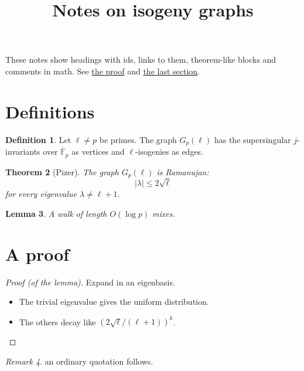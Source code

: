 \documentclass{amsart}
\newtheorem{theorem}{Theorem}
\newtheorem{lemma}[theorem]{Lemma}
\theoremstyle{definition}
\newtheorem{definition}[theorem]{Definition}
\theoremstyle{remark}
\newtheorem{remark}[theorem]{Remark}
\begin{document}
\title{Notes on isogeny graphs}
\maketitle

These notes show headings with ids, links to them, theorem-like blocks and comments in
math. See \hyperref[tn-h-a-proof]{the proof} and \hyperref[tn-h-remarks-questions]{the last section}.

\section{Definitions}\label{tn-h-definitions}

\begin{definition}
Let \(\ell \ne p\) be primes. The graph \(G_p(\ell)\) has the supersingular
\(j\)-invariants over \(\overline{\mathbb{F}}_p\) as vertices and \(\ell\)-isogenies as edges.

\end{definition}

\begin{theorem}[{Pizer}]
The graph \(G_p(\ell)\) is Ramanujan:
\[
|\lambda| \le 2\sqrt{\ell}
\]
for every eigenvalue \(\lambda \ne \ell + 1\).

\end{theorem}

\begin{lemma}
A walk of length \(O(\log p)\) mixes.

\end{lemma}

\section{A proof}\label{tn-h-a-proof}

\begin{proof}[{Proof (of the lemma)}]
Expand in an eigenbasis.

\begin{itemize}
\item The trivial eigenvalue gives the uniform distribution.
\item The others decay like \((2\sqrt{\ell}/(\ell+1))^k\).
\end{itemize}

\end{proof}

\begin{remark}
an ordinary quotation follows.

\end{remark}
\end{document}
